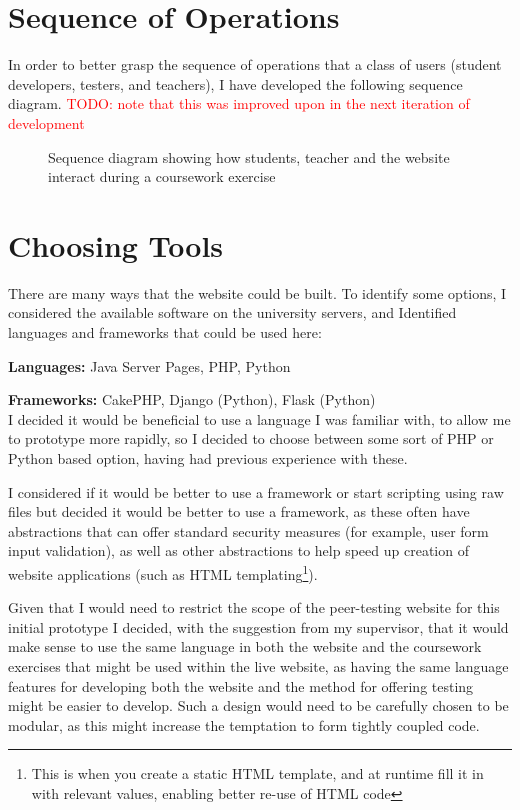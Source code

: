 \documentclass[a4paper,11pt]{report}
\newcommand{\todo}[1]{\textcolor{red}{TODO: #1}}
\begin{document}
\section{Sequence of Operations}
In order to better grasp the sequence of operations that a class of users (student developers, testers, and teachers), I have developed the following sequence diagram. \todo{note that this was improved upon in the next iteration of development}\\
\begin{figure}[ht]

\caption{Sequence diagram showing how students, teacher and the website interact during a coursework exercise}
\label{fig:i1sd}
\end{figure}


\section{Choosing Tools}
There are many ways that the website could be built. To identify some options, I considered the available software on the university servers, and Identified languages and frameworks that could be used here:\par
\textbf{Languages:} Java Server Pages, PHP, Python\par
\textbf{Frameworks:} CakePHP, Django (Python), Flask (Python)\\
I decided it would be beneficial to use a language I was familiar with, to allow me to prototype more rapidly, so I decided to choose between some sort of PHP or Python based option, having had previous experience with these.\par
I considered if it would be better to use a framework or start scripting using raw files but decided it would be better to use a framework, as these often have abstractions that can offer standard security measures (for example, user form input validation), as well as other abstractions to help speed up creation of website applications (such as HTML templating\footnote{This is when you create a static HTML template, and at runtime fill it in with relevant values, enabling better re-use of HTML code}).\par
Given that I would need to restrict the scope of the peer-testing website for this initial prototype I decided, with the suggestion from my supervisor, that it would make sense to use the same language in both the website and the coursework exercises that might be used within the live website, as having the same language features for developing both the website and the method for offering testing might be easier to develop. Such a design would need to be carefully chosen to be modular, as this might increase the temptation to form tightly coupled code.\par
\end{document}
